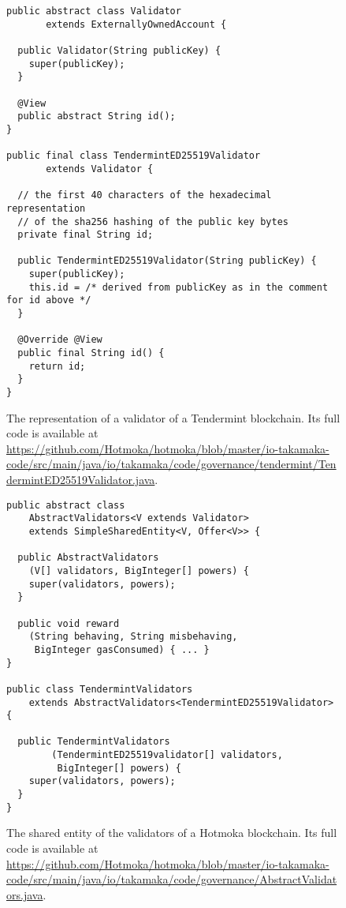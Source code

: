 \begin{figure}[t]
  \begin{center}
    \begin{lstlisting}[language=Takamaka]
public abstract class Validator 
       extends ExternallyOwnedAccount {

  public Validator(String publicKey) {
    super(publicKey);
  }

  @View
  public abstract String id();
}

public final class TendermintED25519Validator 
       extends Validator {

  // the first 40 characters of the hexadecimal representation
  // of the sha256 hashing of the public key bytes
  private final String id;

  public TendermintED25519Validator(String publicKey) {
    super(publicKey);
    this.id = /* derived from publicKey as in the comment for id above */
  }

  @Override @View
  public final String id() {
    return id;
  }
}
    \end{lstlisting}
  \end{center}
  \caption{The representation of a validator of a Tendermint blockchain.
  Its full code is available at \url{https://github.com/Hotmoka/hotmoka/blob/master/io-takamaka-code/src/main/java/io/takamaka/code/governance/tendermint/TendermintED25519Validator.java}.}\label{fig:validator}
\end{figure}

\begin{figure}[t]
  \begin{center}
    \begin{lstlisting}[language=Takamaka]
public abstract class 
    AbstractValidators<V extends Validator>
    extends SimpleSharedEntity<V, Offer<V>> {

  public AbstractValidators
    (V[] validators, BigInteger[] powers) {
    super(validators, powers);
  }

  public void reward
    (String behaving, String misbehaving, 
     BigInteger gasConsumed) { ... }
}

public class TendermintValidators
    extends AbstractValidators<TendermintED25519Validator> {

  public TendermintValidators
        (TendermintED25519validator[] validators, 
         BigInteger[] powers) {
    super(validators, powers);
  }
}
    \end{lstlisting}
  \end{center}
  \caption{The shared entity of the validators of a Hotmoka blockchain.
  Its full code is available at \url{https://github.com/Hotmoka/hotmoka/blob/master/io-takamaka-code/src/main/java/io/takamaka/code/governance/AbstractValidators.java}.}\label{fig:abstract_validators}
\end{figure}

